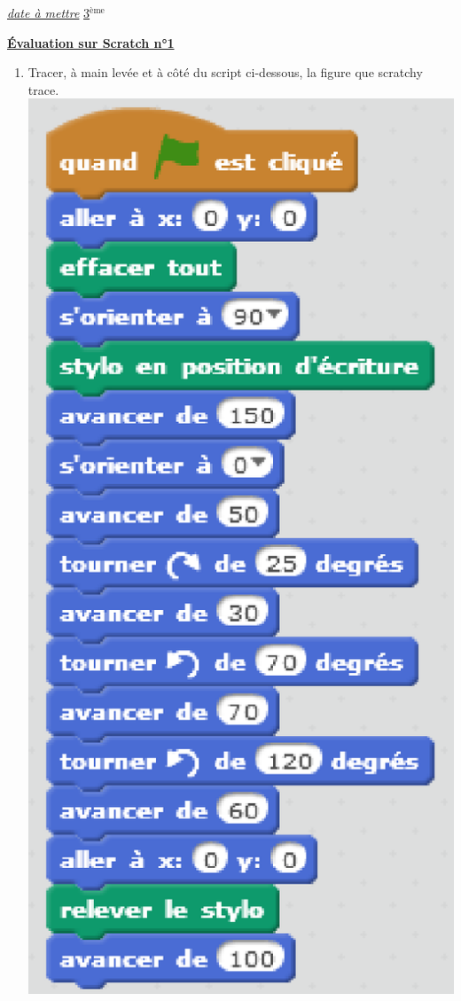 \documentclass[12pt,a4paper]{article}
\newcommand{\ent}[4]{\begin{flushleft}
\underline{#1}
\hfill
\underline{#2$^{\text{ème}}$ #3}
\vspace{12 pt}
\end{flushleft}
\begin{center}
\begin{LARGE}
\textbf{\underline{\'Evaluation sur Scratch n°#4}}
\vspace{12 pt}
\end{LARGE}
\end{center}}
\begin{document}
\ent{\textit{date à mettre}}{3}{}{1}
\begin{enumerate} [1{)}]
\item
Tracer, à main levée et à côté du script ci-dessous, la figure que scratchy trace. \vspace{3pt} \\
\includegraphics[scale=0.5]{Evaluation1_Script.eps} \vspace{3pt}

\end{enumerate}
\end{document}
